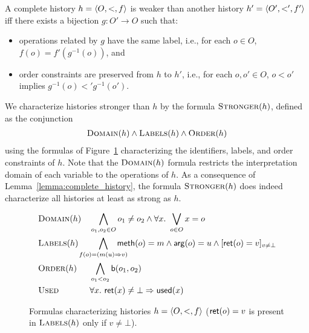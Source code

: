 \begin{lemma}
  \label{lemma:complete_history}

  A complete history $h={\langle{O,<,f}\rangle}$ is weaker than another history
  $h'={\langle{O',<',f'}\rangle}$ iff there exists a bijection $g:O' \to O$ such that:

  \begin{itemize}

    \item operations related by $g$ have the same label, i.e., for each $o\in O$, $f(o)=f'(g^{-1}(o))$, and

    \item order constraints are preserved from $h$ to $h'$, i.e., for each $o,o'\in O$, $o< o'$ implies $g^{-1}(o)<' g^{-1}(o')$.


  \end{itemize}

\end{lemma}

We characterize histories stronger than $h$ by the formula $\textsc{Stronger}(h)$, defined as
the conjunction
\begin{align*}
  \textsc{Domain}(h) \land \textsc{Labels}(h) \land \textsc{Order}(h)
\end{align*}
using the formulas of Figure~\ref{fig:formula:history} characterizing the
identifiers, labels, and order constraints of $h$. Note that
the $\textsc{Domain}(h)$ formula restricts the interpretation domain of each
variable to the operations of $h$. As a consequence of
Lemma~\ref{lemma:complete_history}, the formula $\textsc{Stronger}(h)$ does
indeed characterize all histories at least as strong as $h$.

\begin{figure}

  \footnotesize
  \begin{align*}
    & \textsc{Domain}(h)
    && \bigwedge_{o_1, o_2 \in O} o_1 \neq o_2 \land \forall x.\ \bigvee_{o\in O} x = o \\
    & \textsc{Labels}(h)
    && \hspace{-5mm} \bigwedge_{f(o) = (m(u) \Rightarrow v)}
      \hspace{-5mm}
      {\sf meth}(o) = m \land {\sf arg}(o) = u \land 
      [{\sf ret}(o) = v]_{v \neq \bot} \\
    & \textsc{Order}(h)
    && \bigwedge_{o_1 < o_2} {\sf b}(o_1, o_2) \\
    & \textsc{Used} 
    && \forall x.\ {\sf ret}(x) \neq \bot \implies {\sf used}(x)
  \end{align*}

  \caption{Formulas characterizing histories $h = {\langle{O,<,f}\rangle}$ (${\sf ret}(o) = v$
  is present in $\textsc{Labels}(h)$ only if $v\neq \bot$).}
  \label{fig:formula:history}

\end{figure}

